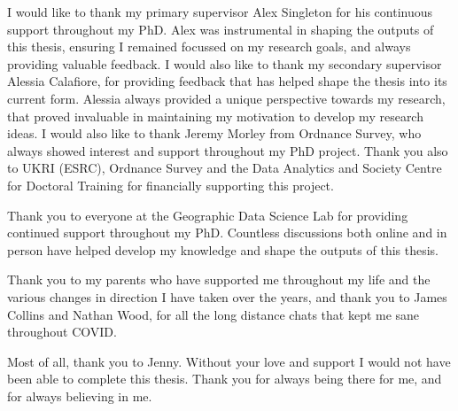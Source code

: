 I would like to thank my primary supervisor Alex Singleton for his continuous support throughout my PhD. Alex was instrumental in shaping the outputs of this thesis, ensuring I remained focussed on my research goals, and always providing valuable feedback. I would also like to thank my secondary supervisor Alessia Calafiore, for providing feedback that has helped shape the thesis into its current form. Alessia always provided a unique perspective towards my research, that proved invaluable in maintaining my motivation to develop my research ideas. I would also like to thank Jeremy Morley from Ordnance Survey, who always showed interest and support throughout my PhD project. Thank you also to UKRI (ESRC), Ordnance Survey and the Data Analytics and Society Centre for Doctoral Training for financially supporting this project.

Thank you to everyone at the Geographic Data Science Lab for providing continued support throughout my PhD. Countless discussions both online and in person have helped develop my knowledge and shape the outputs of this thesis.

Thank you to my parents who have supported me throughout my life and the various changes in direction I have taken over the years, and thank you to James Collins and Nathan Wood, for all the long distance chats that kept me sane throughout COVID.

Most of all, thank you to Jenny. Without your love and support I would not have been able to complete this thesis. Thank you for always being there for me, and for always believing in me.
